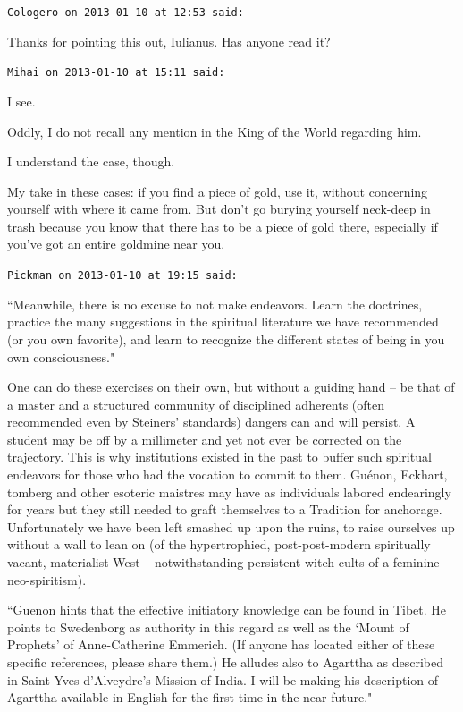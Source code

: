 \begin{footnotesize}
\begin{sffamily}
\texttt{Cologero on 2013-01-10 at 12:53 said: }

Thanks for pointing this out, Iulianus. Has anyone read it?


\hfill

\texttt{Mihai on 2013-01-10 at 15:11 said: }

I see.

Oddly, I do not recall any mention in the King of the World regarding him. 

I understand the case, though.

My take in these cases: if you find a piece of gold, use it, without concerning yourself with where it came from. But don't go burying yourself neck-deep in trash because you know that there has to be a piece of gold there, especially if you've got an entire goldmine near you.


\hfill

\texttt{Pickman on 2013-01-10 at 19:15 said: }

``Meanwhile, there is no excuse to not make endeavors. Learn the doctrines, practice the many suggestions in the spiritual literature we have recommended (or you own favorite), and learn to recognize the different states of being in you own consciousness."

One can do these exercises on their own, but without a guiding hand – be that of a master and a structured community of disciplined adherents (often recommended even by Steiners' standards) dangers can and will persist. A student may be off by a millimeter and yet not ever be corrected on the trajectory. This is why institutions existed in the past to buffer such spiritual endeavors for those who had the vocation to commit to them. Guénon, Eckhart, tomberg and other esoteric maistres may have as individuals labored endearingly for years but they still needed to graft themselves to a Tradition for anchorage. Unfortunately we have been left smashed up upon the ruins, to raise ourselves up without a wall to lean on (of the hypertrophied, post-post-modern spiritually vacant, materialist West – notwithstanding persistent witch cults of a feminine neo-spiritism).

``Guenon hints that the effective initiatory knowledge can be found in Tibet. He points to Swedenborg as authority in this regard as well as the `Mount of Prophets' of Anne-Catherine Emmerich. (If anyone has located either of these specific references, please share them.) He alludes also to Agarttha as described in Saint-Yves d'Alveydre's Mission of India. I will be making his description of Agarttha available in English for the first time in the near future."


\end{sffamily}
\end{footnotesize}
